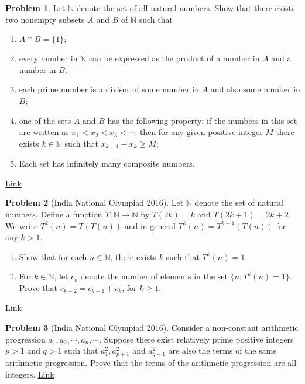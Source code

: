 \documentclass[]{article}
\theoremstyle{definition}
\newtheorem{problem}{Problem}
\begin{document}
\begin{problem}
	Let $\mathbb N$ denote the set of all natural numbers. Show that there exists two nonempty subsets $A$ and $B$ of $\mathbb N$ such that
		\begin{enumerate}
			\item $A\cap B=\{1\};$
			\item every number in $\mathbb N$ can be expressed as the product of a number in $A$ and a number in $B$;
			\item each prime number is a divisor of some number in $A$ and also some number in $B$;
			\item one of the sets $A$ and $B$ has the following property: if the numbers in this set are written as $x_1<x_2<x_3<\cdots$, then for any given positive integer $M$ there exists $k\in \mathbb N$ such that $x_{k+1}-x_k\ge M$;
			\item Each set has infinitely many composite numbers.
		\end{enumerate}
	\flushright \href{http://artofproblemsolving.com/community/c6h1276405p6696414}{Link}
\end{problem}




\begin{problem}[India National Olympiad 2016]
	Let $\mathbb{N}$ denote the set of natural numbers. Define a function $T:\mathbb{N}\rightarrow\mathbb{N}$ by $T(2k)=k$ and $T(2k+1)=2k+2$. We write $T^2(n)=T(T(n))$ and in general $T^k(n)=T^{k-1}(T(n))$ for any $k>1$.
		\begin{enumerate}[(i)]
			\item Show that for each $n\in\mathbb{N}$, there exists $k$ such that $T^k(n)=1$.
			\item For $k\in\mathbb{N}$, let $c_k$ denote the number of elements in the set $\{n: T^k(n)=1\}$. Prove that $c_{k+2}=c_{k+1}+c_k$, for $k\ge 1$.
		\end{enumerate}
	\flushright \href{http://artofproblemsolving.com/community/c6h1186108p5763326}{Link}
\end{problem}





\begin{problem}[India National Olympiad 2016]
	Consider a non-constant arithmetic progression $a_1, a_2,\cdots, a_n,\cdots$. Suppose there exist relatively prime positive integers $p>1$ and $q>1$ such that $a_1^2, a_{p+1}^2$ and $a_{q+1}^2$ are also the terms of the same arithmetic progression. Prove that the terms of the arithmetic progression are all integers. \hfill \href{http://artofproblemsolving.com/community/c6h1186114p5763347}{Link}
\end{problem}
\end{document}
